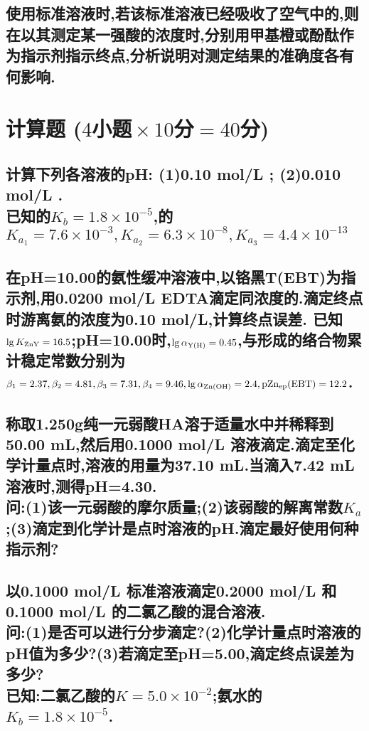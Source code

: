 \documentclass[UTF8]{article}
\newcommand{\ptsMulti}[3]{ \small($#1\!\!$小题$\!\!\times #2\!\!$分$\!\!=\!\!#3\!\!$分)}
\newcommand{\p}{\mathrm{p}}
\newcommand{\ind}{\hspace{-1pt}}
\begin{document}
    \subsection{使用标准溶液时,若该标准溶液已经吸收了空气中的,则在以其测定某一强酸的浓度时,分别用甲基橙或酚酞作为指示剂指示终点,分析说明对测定结果的准确度各有何影响.}
    
    \section{计算题\ptsMulti{4}{10}{40}}

    \subsection{计算下列各溶液的pH: (1)0.10 mol/L ; (2)0.010 mol/L .\\ 已知的$K_b=1.8\times 10^{-5}$,的$K_{a_1}=7.6\times 10^{-3}, K_{a_2}=6.3\times 10^{-8}, K_{a_3}=4.4\times 10^{-13}$}
    
    \subsection{在pH=10.00的氨性缓冲溶液中,以铬黑T(EBT)为指示剂,用0.0200 mol/L EDTA滴定同浓度的.滴定终点时游离氨的浓度为0.10 mol/L,计算终点误差.
        已知$\lg K_{\ce{ZnY}}=16.5$;pH=10.00时,$\lg \alpha_{\ce{Y(H)}}=0.45$,与形成的络合物累计稳定常数分别为$\beta_1=2.37,\beta_2=4.81,\beta_3=7.31,\beta_4=9.46, \lg \alpha_{\ce{Zn(OH)}}=2.4, \p\ce{Zn_{ep}(EBT)}=12.2$.}
    
    \subsection{称取1.250g纯一元弱酸HA溶于适量水中并稀释到50.00 mL,然后用0.1000 mol/L 溶液滴定.滴定至化学计量点时,溶液的用量为37.10 mL.当滴入7.42 mL 溶液时,测得pH=4.30.\\ 问:(1)\ind 该一元弱酸的摩尔质量;(2)\ind 该弱酸的解离常数\ind $K_a$;(3)\ind 滴定到化学计是点时溶液的\ind pH.\ind 滴定最好使用何种指示剂?}
    
    \subsection{以0.1000 mol/L 标准溶液滴定0.2000 mol/L 和0.1000 mol/L 的二氯乙酸的混合溶液.\\ 问:(1)是否可以进行分步滴定?(2)化学计量点时溶液的pH值为多少?(3)若滴定至pH=5.00,滴定终点误差为多少?\\ 已知:二氯乙酸的$K=5.0\times 10^{-2}$;氨水的$K_b=1.8\times 10^{-5}$.}
\end{document}
